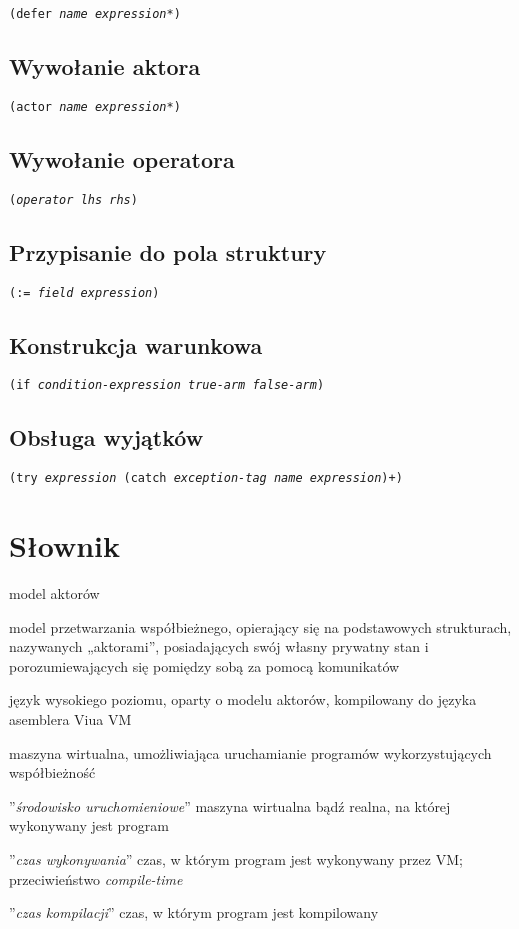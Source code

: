 \documentclass[11pt,oneside,a4paper,titlepage,onecolumn]{article}
\begin{document}
\texttt{(defer \emph{name} \emph{expression}*)}

\subsection{Wywołanie aktora}

\texttt{(actor \emph{name} \emph{expression}*)}

\subsection{Wywołanie operatora}

\texttt{(\emph{operator} \emph{lhs} \emph{rhs})}

\subsection{Przypisanie do pola struktury}

\texttt{(:= \emph{field} \emph{expression})}

\subsection{Konstrukcja warunkowa}

\texttt{(if \emph{condition-expression} \emph{true-arm} \emph{false-arm})}

\subsection{Obsługa wyjątków}

\texttt{(try \emph{expression} (catch \emph{exception-tag} \emph{name} \emph{expression})+)}

\newpage
\section{Słownik}

\begin{labeling}{model aktorów}
    \item [model aktorów] model przetwarzania współbieżnego, opierający się na
        podstawowych strukturach, nazywanych „aktorami”, posiadających swój
        własny prywatny stan i porozumiewających się pomiędzy sobą za pomocą
        komunikatów
    \item [ViuAct] język wysokiego poziomu, oparty o modelu aktorów, kompilowany
        do języka asemblera Viua VM
    \item [Viua VM] maszyna wirtualna, umożliwiająca uruchamianie programów
        wykorzystujących współbieżność
    \item[runtime] ''\emph{środowisko uruchomieniowe}'' maszyna wirtualna bądź realna, na której
        wykonywany jest program
    \item[\emph{run-time}] ''\emph{czas wykonywania}'' czas, w którym program jest wykonywany przez VM;
        przeciwieństwo \emph{compile-time}
    \item[\emph{compile-time}] ''\emph{czas kompilacji}'' czas, w którym program jest kompilowany
\end{labeling}
\end{document}
